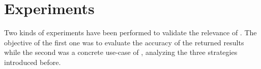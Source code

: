 \section{Experiments}
\label{sec:experiments}


Two kinds of experiments have been performed to validate the relevance
of \vmps. The objective of the first one was to evaluate the accuracy
of the returned results while the second was a concrete use-case of
\vmps, analyzing the three strategies introduced before.



%




